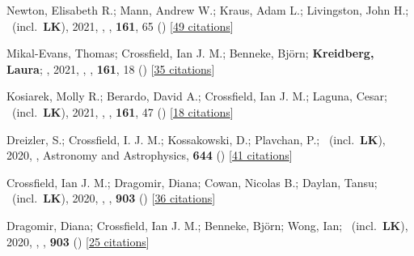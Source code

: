 \item[{\color{numcolor}\scriptsize49}] Newton, Elisabeth R.; Mann, Andrew W.; Kraus, Adam L.; Livingston, John H.; \etal\ (incl.\ \textbf{LK}), 2021, , \aj, \textbf{161}, 65 () [\href{https://ui.adsabs.harvard.edu/abs/2021AJ....161...65N}{49 citations}]

\item[{\color{numcolor}\scriptsize48}] Mikal-Evans, Thomas; Crossfield, Ian J. M.; Benneke, Bj{\"o}rn; \textbf{Kreidberg, Laura}; \etal, 2021, , \aj, \textbf{161}, 18 () [\href{https://ui.adsabs.harvard.edu/abs/2021AJ....161...18M}{35 citations}]

\item[{\color{numcolor}\scriptsize47}] Kosiarek, Molly R.; Berardo, David A.; Crossfield, Ian J. M.; Laguna, Cesar; \etal\ (incl.\ \textbf{LK}), 2021, , \aj, \textbf{161}, 47 () [\href{https://ui.adsabs.harvard.edu/abs/2021AJ....161...47K}{18 citations}]

\item[{\color{numcolor}\scriptsize46}] Dreizler, S.; Crossfield, I. J. M.; Kossakowski, D.; Plavchan, P.; \etal\ (incl.\ \textbf{LK}), 2020, , Astronomy and Astrophysics, \textbf{644} () [\href{https://ui.adsabs.harvard.edu/abs/2020A&A...644A.127D}{41 citations}]

\item[{\color{numcolor}\scriptsize45}] Crossfield, Ian J. M.; Dragomir, Diana; Cowan, Nicolas B.; Daylan, Tansu; \etal\ (incl.\ \textbf{LK}), 2020, , \apj, \textbf{903} () [\href{https://ui.adsabs.harvard.edu/abs/2020ApJ...903L...7C}{36 citations}]

\item[{\color{numcolor}\scriptsize44}] Dragomir, Diana; Crossfield, Ian J. M.; Benneke, Bj{\"o}rn; Wong, Ian; \etal\ (incl.\ \textbf{LK}), 2020, , \apj, \textbf{903} () [\href{https://ui.adsabs.harvard.edu/abs/2020ApJ...903L...6D}{25 citations}]

